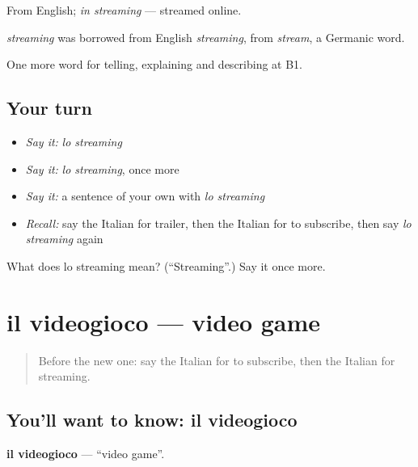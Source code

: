 From English; \emph{in streaming} — streamed online.

\begin{cousinweb}
\emph{streaming} was borrowed from English \emph{streaming}, from \emph{stream}, a Germanic word.
\end{cousinweb}

\begin{grammarlens}[title={What you've built}]
One more word for telling, explaining and describing at B1.
\end{grammarlens}

\subsection*{Your turn}
\begin{itemize}
\raggedright
  \item \emph{Say it:} \emph{lo streaming}
  \item \emph{Say it:} \emph{lo streaming}, once more
  \item \emph{Say it:} a sentence of your own with \emph{lo streaming}
  \item \emph{Recall:} say the Italian for trailer, then the Italian for to subscribe, then say \emph{lo streaming} again
\end{itemize}

\begin{tcolorbox}[breakable,colback=teal!4,colframe=teal!35!black,title={Before you move on}]
What does lo streaming mean? (\textquotedblleft{}Streaming\textquotedblright{}.) Say it once more.
\end{tcolorbox}
\section[il videogioco]{il videogioco — video game}

\label{lesson:IT-C530-videogioco}



\begin{quote}
Before the new one: say the Italian for to subscribe, then the Italian for streaming.
\end{quote}

\subsection*{You'll want to know: il videogioco}
\textbf{il videogioco} — \textquotedblleft{}video game\textquotedblright{}.

